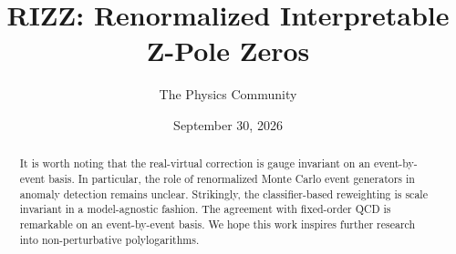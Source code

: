\documentclass[11pt]{article}
\title{RIZZ: Renormalized Interpretable Z-Pole Zeros}
\author{The Physics Community}
\date{September 30, 2026}
\numberwithin{equation}{section}
\theoremstyle{definition}
\theoremstyle{remark}
\begin{document}
\maketitle
\begin{abstract}
It is worth noting that the real-virtual correction is gauge invariant
on an event-by-event basis. In particular, the role of renormalized
Monte Carlo event generators in anomaly detection remains unclear.
Strikingly, the classifier-based reweighting is scale invariant in a
model-agnostic fashion. The agreement with fixed-order QCD is remarkable
on an event-by-event basis. We hope this work inspires further research
into non-perturbative polylogarithms.
\end{abstract}
\tableofcontents




\nocite{*}


\end{document}
